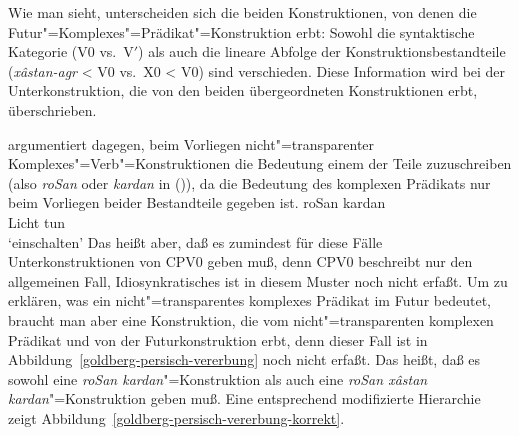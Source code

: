 Wie man sieht, unterscheiden sich die beiden Konstruktionen, von denen die Futur"=Komplexes"=Prädikat"=Konstruktion
erbt: Sowohl die syntaktische Kategorie (V0 vs.\ V$'$)
als auch die lineare Abfolge der Konstruktionsbestandteile (\emph{x{\^a}stan-agr}  <  V0 vs.\ X0  <  V0)
sind verschieden. Diese Information wird bei der Unterkonstruktion, die von den beiden übergeordneten
Konstruktionen erbt, überschrieben.

\citet[\page]{Goldberg2003a} %
argumentiert dagegen, beim Vorliegen nicht"=transparenter Komplexes"=Verb"=Konstruktionen die Bedeutung
einem der Teile zuzuschreiben (also \emph{roSan} oder \emph{kardan} in ()),
da die Bedeutung des komplexen Prädikats nur beim Vorliegen beider Bestandteile gegeben ist. 
\ea
\gll roSan kardan\\
     Licht tun\\\nopagebreak
\glt `einschalten'
\z
Das heißt aber, daß es zumindest für diese Fälle Unterkonstruktionen von CPV0 geben muß,
denn CPV0 beschreibt nur den allgemeinen Fall, Idiosynkratisches ist in diesem Muster noch nicht erfaßt.
Um zu erklären, was ein nicht"=transparentes komplexes Prädikat im Futur bedeutet, braucht man aber
eine Konstruktion, die vom nicht"=transparenten komplexen Prädikat und von der Futurkonstruktion erbt,
denn dieser Fall ist in Abbildung~\ref{goldberg-persisch-vererbung} noch nicht erfaßt. Das heißt,
daß es sowohl eine \emph{roSan kardan}"=Konstruktion als auch eine \emph{roSan x{\^a}stan kardan}"=Konstruktion
geben muß. Eine entsprechend modifizierte Hierarchie zeigt Abbildung~\vref{goldberg-persisch-vererbung-korrekt}.
